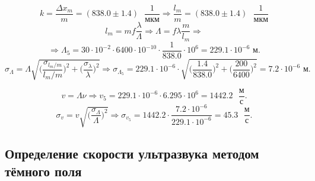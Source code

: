 \documentclass[a4paper,12pt]{article} %
\begin{document}
\[ k = \frac{\Delta x_{m}}{m} = (838.0\pm1.4)\text{ }\frac{1}{\text{мкм}} \Rightarrow \frac{l_{m}}{m} = (838.0\pm1.4)\text{ }\frac{1}{\text{мкм}} \]
\[ l_{m}=mf\frac{\lambda}{\Lambda} \Rightarrow \Lambda = f\lambda\frac{m}{l_{m}} \Rightarrow  \]
\[ \Rightarrow \Lambda_5 = 30\cdot10^{-2}\cdot6400\cdot10^{-10}\cdot\frac{1}{838.0}\cdot10^{6}=229.1\cdot10^{-6}\text{ м}. \]
\[ \sigma_{\Lambda} = \Lambda\sqrt{\Big(\frac{\sigma_{l_{m}/m}}{l_{m}/m}\Big)^2+ \Big(\frac{\sigma_{\lambda}}{\lambda}\Big)^2} \Rightarrow \sigma_{\Lambda_5} = 229.1\cdot10^{-6}\cdot\sqrt{\Big(\frac{1.4}{838.0}\Big)^2+\Big(\frac{200}{6400}\Big)^2} = 7.2\cdot10^{-6}\text{ м}. \]

\centering{}

\[ v=\Lambda\nu \Rightarrow v_5=229.1\cdot10^{-6}\cdot6.295\cdot10^{6}=1442.2\text{ }\frac{\text{м}}{\text{с}}. \]
\[ \sigma_{v} = v\sqrt{\Big(\frac{\sigma_{\Lambda}}{\Lambda}\Big)^2} \Rightarrow \sigma_{v_5} = 1442.2\cdot\frac{7.2\cdot10^{-6}}{229.1\cdot10^{-6}} = 45.3\text{ }\frac{\text{м}}{\text{с}}. \]

\centering{}

\newpage

\raggedright\subsection{Определение скорости ультразвука методом тёмного поля}
\end{document}

